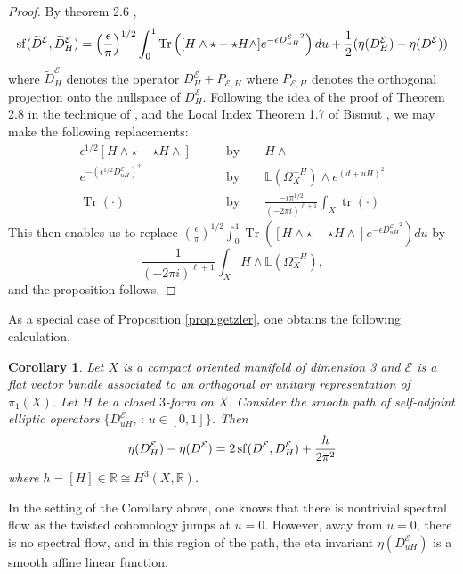 \documentclass[12pt]{amsart}
\theoremstyle{plain}
\newtheorem{corollary}[theorem]{Corollary}
\theoremstyle{definition}
\theoremstyle{remark}
\begin{document}
{\begin{proof} By theorem 2.6 \cite{Getzler}, 
$$
{\rm sf}(\widetilde D^{\mathcal E}, \widetilde D^{\mathcal E}_H) = \left(\frac{\epsilon}{\pi}\right)^{1/2}\int_0^1 {\operatorname{Tr}}\left([H \wedge \star - \star H \wedge]
e^{-\epsilon {D^{\mathcal E}_{uH}}^2}\right) du
 + \frac{1}{2}(\eta(D^{\mathcal E}_H) - \eta(D^{\mathcal E}))
$$
where $\widetilde D^{\mathcal E}_H$ denotes the operator $ D^{\mathcal E}_H + P_{{\mathcal E}, H}$ where $P_{{\mathcal E}, H}$ denotes the 
orthogonal projection onto the nullspace of $ D^{\mathcal E}_H$. Following the idea of the proof of Theorem 2.8 in \cite{Getzler}
the technique of \cite{BGV}, and the Local Index Theorem 1.7 of Bismut \cite{Bismut}, we may make the following replacements:
\begin{align*}
\epsilon^{1/2} [H \wedge \star - \star H \wedge]\qquad & \text{by} \qquad H\wedge\\  
e^{- (\epsilon^{1/2}D^{\mathcal E}_{uH})^2} \qquad & \text{by} \qquad  {\mathbb{L}}(\Omega_X^{-H}) \wedge e^{(d+uH)^2}\\
{\operatorname{Tr}}(\cdot) \qquad & \text{by} \qquad \frac{-i\pi^{1/2}}{(-2\pi i)^{\ell+1}} \displaystyle\int_X {\operatorname{tr}}(\cdot)
\end{align*}  
This then enables us to replace $ \left(\frac{\epsilon}{\pi}\right)^{1/2}\displaystyle\int_0^1 {\operatorname{Tr}}\left([H \wedge \star - \star H \wedge]
e^{-\epsilon {D^{\mathcal E}_{uH}}^2}\right) du$ by 
$$
 \frac{1}{(-2\pi i)^{\ell+1}} \int_X H \wedge {\mathbb{L}}(\Omega_X^{-H}),
$$
and the proposition follows.
\end{proof} 

As a special case of  Proposition \ref{prop:getzler}, one obtains the following calculation,

\begin{corollary}
Let $X$ is a compact oriented manifold of dimension 3 and
${\mathcal E}$ is a flat vector bundle associated to an orthogonal or unitary
representation of $\pi_1(X)$.
Let $H$ be a closed $3$-form on $X$.
Consider the smooth path of self-adjoint elliptic operators $\{D^{\mathcal E}_{uH}, \, : \, u\in [0,1]\}$. Then
$$
\eta(D^{\mathcal E}_H) - \eta(D^{\mathcal E}) = 2\, {\rm sf}(D^{\mathcal E}, D^{\mathcal E}_H)  + \frac{h}{2\pi^2}
$$
where $h=[H] \in \mathbb R\cong H^3(X, {\mathbb{R}})$.
\end{corollary}

In the setting of the Corollary above, one knows that there is nontrivial spectral flow
as the twisted cohomology jumps at $u=0$. However, away from $u=0$, there is no spectral 
flow, and in this region of the path, the eta invariant $\eta(D^{\mathcal E}_{uH})$ is a smooth affine linear
function. 

}
\end{document}
